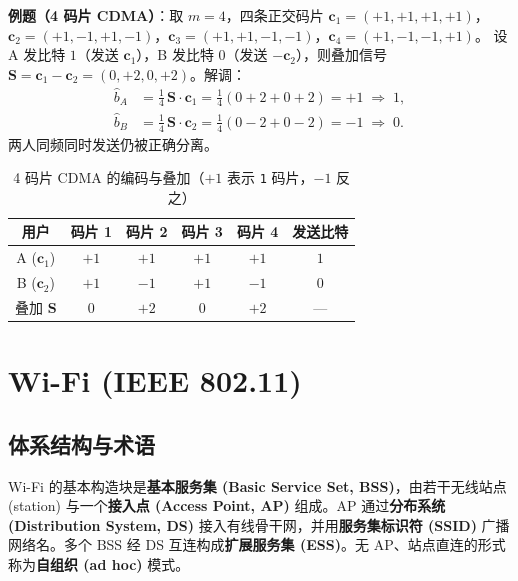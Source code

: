 \textbf{例题（4 码片 CDMA）}：取 $m=4$，四条正交码片
$\mathbf{c}_1=(+1,+1,+1,+1)$，$\mathbf{c}_2=(+1,-1,+1,-1)$，$\mathbf{c}_3=(+1,+1,-1,-1)$，$\mathbf{c}_4=(+1,-1,-1,+1)$。
设 A 发比特 $1$（发送 $\mathbf{c}_1$），B 发比特 $0$（发送 $-\mathbf{c}_2$），则叠加信号
$\mathbf{S}=\mathbf{c}_1-\mathbf{c}_2=(0,+2,0,+2)$。解调：
\begin{align}
    \hat{b}_A &= \tfrac{1}{4}\,\mathbf{S}\cdot\mathbf{c}_1 = \tfrac{1}{4}(0+2+0+2)=+1 \;\Rightarrow\; 1,\\
    \hat{b}_B &= \tfrac{1}{4}\,\mathbf{S}\cdot\mathbf{c}_2 = \tfrac{1}{4}(0-2+0-2)=-1 \;\Rightarrow\; 0.
\end{align}
两人同频同时发送仍被正确分离。

\begin{table}[H]
\centering
\caption{4 码片 CDMA 的编码与叠加（$+1$ 表示 \texttt{1} 码片，$-1$ 反之）}
\renewcommand{\arraystretch}{1.4}
\begin{tabulary}{\textwidth}{@{}CCCCCC@{}}
\toprule
\textbf{用户} & \textbf{码片 1} & \textbf{码片 2} & \textbf{码片 3} & \textbf{码片 4} & \textbf{发送比特} \\
\midrule
A ($\mathbf{c}_1$) & $+1$ & $+1$ & $+1$ & $+1$ & $1$ \\
B ($\mathbf{c}_2$) & $+1$ & $-1$ & $+1$ & $-1$ & $0$ \\
叠加 $\mathbf{S}$   & $0$  & $+2$ & $0$  & $+2$ & --- \\
\bottomrule
\end{tabulary}
\end{table}

\section{Wi-Fi (IEEE 802.11)}

\subsection{体系结构与术语}

Wi-Fi 的基本构造块是\textbf{基本服务集 (Basic Service Set, BSS)}，由若干无线站点 (station) 与一个\textbf{接入点 (Access Point, AP)} 组成。AP 通过\textbf{分布系统 (Distribution System, DS)} 接入有线骨干网，并用\textbf{服务集标识符 (SSID)} 广播网络名。多个 BSS 经 DS 互连构成\textbf{扩展服务集 (ESS)}。无 AP、站点直连的形式称为\textbf{自组织 (ad hoc)} 模式。

